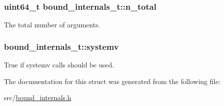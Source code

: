 \subsubsection[{\texorpdfstring{n\+\_\+total}{n_total}}]{\setlength{\rightskip}{0pt plus 5cm}uint64\+\_\+t bound\+\_\+internals\+\_\+t\+::n\+\_\+total}\hypertarget{structbound__internals__t_a804e2e3c6b4c0ca1814c6884ed0bd161}{}\label{structbound__internals__t_a804e2e3c6b4c0ca1814c6884ed0bd161}


The total number of arguments. 

\subsubsection[{\texorpdfstring{systemv}{systemv}}]{ bound\+\_\+internals\+\_\+t\+::systemv}\hypertarget{structbound__internals__t_af4af2491e60d6cda5a3bde0091d8b5c0}{}\label{structbound__internals__t_af4af2491e60d6cda5a3bde0091d8b5c0}


True if systemv calls should be used. 



The documentation for this struct was generated from the following file\+:\begin{DoxyCompactItemize}
\item 
src/\hyperlink{bound__internals_8h}{bound\+\_\+internals.\+h}\end{DoxyCompactItemize}
